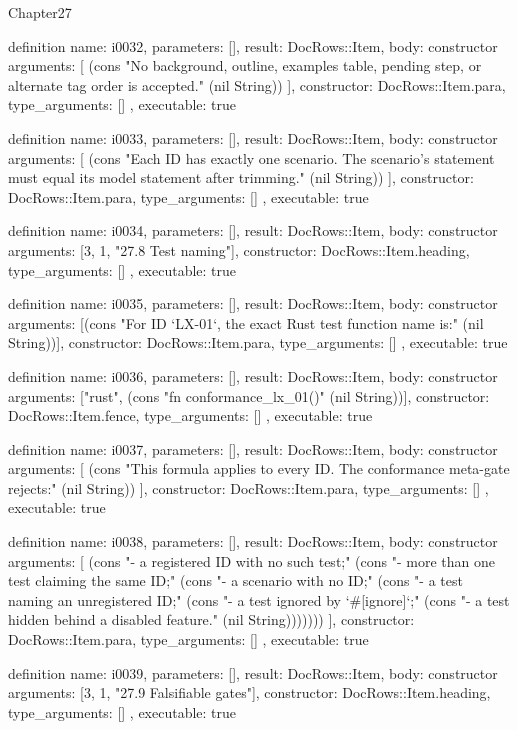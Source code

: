 \begin{lexlean}{Chapter27}
\begin{semanticmodule}
definition{
  name: i0032,
  parameters: [],
  result: DocRows::Item,
  body: constructor{
    arguments: [
      (cons "No background, outline, examples table, pending step, or alternate tag order is accepted." (nil String))
    ],
    constructor: DocRows::Item.para,
    type_arguments: []
  },
  executable: true
}

definition{
  name: i0033,
  parameters: [],
  result: DocRows::Item,
  body: constructor{
    arguments: [
      (cons "Each ID has exactly one scenario. The scenario's statement must equal its model statement after trimming." (nil String))
    ],
    constructor: DocRows::Item.para,
    type_arguments: []
  },
  executable: true
}

definition{
  name: i0034,
  parameters: [],
  result: DocRows::Item,
  body: constructor{
    arguments: [3, 1, "27.8 Test naming"],
    constructor: DocRows::Item.heading,
    type_arguments: []
  },
  executable: true
}

definition{
  name: i0035,
  parameters: [],
  result: DocRows::Item,
  body: constructor{
    arguments: [(cons "For ID `LX-01`, the exact Rust test function name is:" (nil String))],
    constructor: DocRows::Item.para,
    type_arguments: []
  },
  executable: true
}

definition{
  name: i0036,
  parameters: [],
  result: DocRows::Item,
  body: constructor{
    arguments: ["rust", (cons "fn conformance_lx_01()" (nil String))],
    constructor: DocRows::Item.fence,
    type_arguments: []
  },
  executable: true
}

definition{
  name: i0037,
  parameters: [],
  result: DocRows::Item,
  body: constructor{
    arguments: [
      (cons "This formula applies to every ID. The conformance meta-gate rejects:" (nil String))
    ],
    constructor: DocRows::Item.para,
    type_arguments: []
  },
  executable: true
}

definition{
  name: i0038,
  parameters: [],
  result: DocRows::Item,
  body: constructor{
    arguments: [
      (cons "- a registered ID with no such test;" (cons "- more than one test claiming the same ID;" (cons "- a scenario with no ID;" (cons "- a test naming an unregistered ID;" (cons "- a test ignored by `#[ignore]`;" (cons "- a test hidden behind a disabled feature." (nil String)))))))
    ],
    constructor: DocRows::Item.para,
    type_arguments: []
  },
  executable: true
}

definition{
  name: i0039,
  parameters: [],
  result: DocRows::Item,
  body: constructor{
    arguments: [3, 1, "27.9 Falsifiable gates"],
    constructor: DocRows::Item.heading,
    type_arguments: []
  },
  executable: true
}


\end{semanticmodule}
\end{lexlean}

